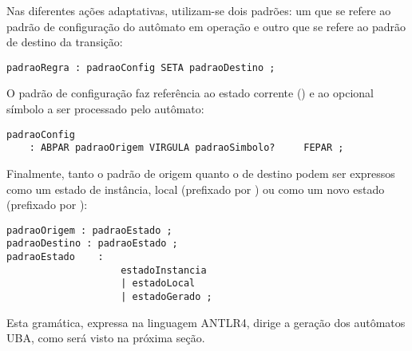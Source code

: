 Nas diferentes ações adaptativas, utilizam-se dois padrões: um que se refere ao padrão de configuração do autômato em operação e outro que se refere ao padrão de destino da transição:

\begin{lstlisting}[style=antlr]
padraoRegra : padraoConfig SETA padraoDestino ;
\end{lstlisting}

O padrão de configuração faz referência ao estado corrente () e ao opcional símbolo a ser processado pelo autômato:

\begin{lstlisting}[style=antlr]
padraoConfig
	: ABPAR padraoOrigem VIRGULA padraoSimbolo? 	FEPAR ;
\end{lstlisting}

Finalmente, tanto o padrão de origem quanto o de destino podem ser expressos como um estado de instância, local (prefixado por ) ou como um novo estado (prefixado por \terminal{^}):

\begin{lstlisting}[style=antlr]
padraoOrigem : padraoEstado ;
padraoDestino : padraoEstado ;
padraoEstado 	:
					estadoInstancia
					| estadoLocal
					| estadoGerado ;
\end{lstlisting}

Esta gramática, expressa na linguagem ANTLR4, dirige a geração dos autômatos UBA, como será visto na próxima seção.
